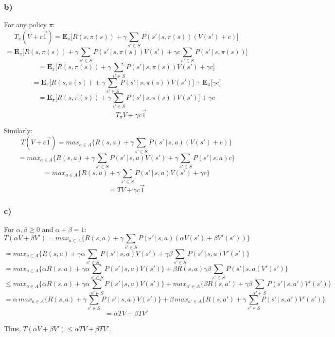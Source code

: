 \documentclass[11pt]{scrartcl}
\begin{document}
\subsubsection*{b)}
For any policy $\pi$:
$$T_{\pi} (V + c \vec{1}) = \bm{E}_{\pi} \bigg[ R(s, \pi(s)) + \gamma \sum_{s' \in S} P(s' \, | \, s, \pi(s)) (V(s') + c) \bigg]$$
$$= \bm{E}_{\pi} \bigg[ R(s, \pi(s)) + \gamma \sum_{s' \in S} P(s' \, | \, s, \pi(s)) V(s') + \gamma c \sum_{s' \in S} P(s' \, | \, s, \pi(s)) \bigg]$$
$$= \bm{E}_{\pi} \bigg[ R(s, \pi(s)) + \gamma \sum_{s' \in S} P(s' \, | \, s, \pi(s)) V(s') + \gamma c \bigg]$$
$$= \bm{E}_{\pi} \bigg[ R(s, \pi(s)) + \gamma \sum_{s' \in S} P(s' \, | \, s, \pi(s)) V(s') \bigg] + \bm{E}_{\pi} \bigg[\gamma c \bigg]$$
$$= \bm{E}_{\pi} \bigg[ R(s, \pi(s)) + \gamma \sum_{s' \in S} P(s' \, | \, s, \pi(s)) V(s') \bigg] + \gamma c$$
$$\boxed{= T_{\pi} V + \gamma c \vec{1}}$$

Similarly:
$$T(V + c \vec{1}) = max_{a \in A} \bigg\{R(s,a) + \gamma \sum_{s' \in S} P(s' \, | \, s,a) (V(s') + c) \bigg\}$$
$$= max_{a \in A} \bigg\{R(s,a) + \gamma \sum_{s' \in S} P(s' \, | \, s,a) V(s') + \gamma \sum_{s' \in S} P(s' \, | \, s,a) c \bigg\}$$
$$= max_{a \in A} \bigg\{R(s,a) + \gamma \sum_{s' \in S} P(s' \, | \, s,a) V(s') + \gamma c \bigg\}$$
$$\boxed{= TV + \gamma c \vec{1}}$$

\subsubsection*{c)}
For $\alpha, \beta \geq 0$ and $\alpha + \beta = 1$:
$$T(\alpha V + \beta V') = max_{a \in A} \bigg\{R(s,a) + \gamma \sum_{s' \in S} P(s' \, | \, s,a) (\alpha V(s') + \beta V'(s')) \bigg\}$$
$$= max_{a \in A} \bigg\{R(s,a) + \gamma \alpha \sum_{s' \in S} P(s' \, | \, s,a) V(s') + \gamma \beta \sum_{s' \in S} P(s' \, | \, s,a) V'(s') \bigg\}$$
$$= max_{a \in A} \bigg\{\alpha R(s,a) + \gamma \alpha \sum_{s' \in S} P(s' \, | \, s,a) V(s')\bigg\} + \beta R(s, a) \gamma \beta \sum_{s' \in S} P(s' \, | \, s,a) V'(s') \bigg\}$$
$$\leq max_{a \in A} \bigg\{\alpha R(s,a) + \gamma \alpha \sum_{s' \in S} P(s' \, | \, s,a) V(s')\bigg\} + max_{a' \in A} \bigg\{\beta R(s,a') + \gamma \beta \sum_{s' \in S} P(s' \, | \, s,a') V'(s')\bigg\}$$ 
$$= \alpha \, max_{a \in A} \bigg\{R(s,a) + \gamma \sum_{s' \in S} P(s' \, | \, s,a) V(s')\bigg\} + \beta \, max_{a' \in A} \bigg\{R(s,a') + \gamma \sum_{s' \in S} P(s' \, | \, s,a') V'(s')\bigg\}$$
$$= \alpha TV + \beta TV'$$

Thus, $T(\alpha V + \beta V') \leq \alpha TV + \beta TV'$.
\end{document}
